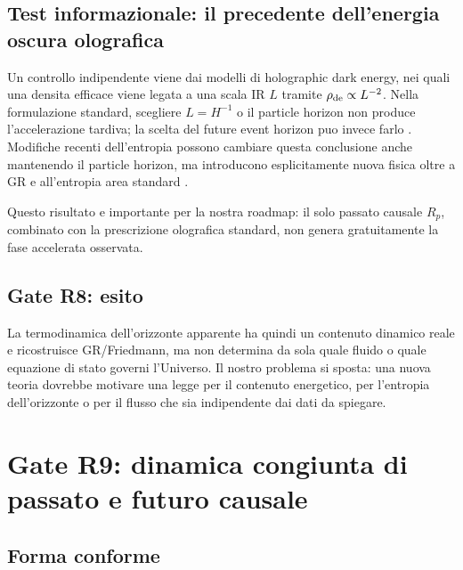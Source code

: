 \documentclass[11pt,a4paper]{article}
\begin{document}
\subsection{Test informazionale: il precedente dell'energia oscura olografica}

Un controllo indipendente viene dai modelli di holographic dark energy, nei quali una densita efficace viene legata a una scala IR $L$ tramite $\rho_{\rm de}\propto L^{-2}$. Nella formulazione standard, scegliere $L=H^{-1}$ o il particle horizon non produce l'accelerazione tardiva; la scelta del future event horizon puo invece farlo \cite{Akhlaghi2018}. Modifiche recenti dell'entropia possono cambiare questa conclusione anche mantenendo il particle horizon, ma introducono esplicitamente nuova fisica oltre a GR e all'entropia area standard \cite{Asvar2026}.

Questo risultato e importante per la nostra roadmap: il solo passato causale $R_p$, combinato con la prescrizione olografica standard, non genera gratuitamente la fase accelerata osservata.

\subsection{Gate R8: esito}

\begin{center}
\end{center}

La termodinamica dell'orizzonte apparente ha quindi un contenuto dinamico reale e ricostruisce GR/Friedmann, ma non determina da sola quale fluido o quale equazione di stato governi l'Universo. Il nostro problema si sposta: una nuova teoria dovrebbe motivare una legge per il contenuto energetico, per l'entropia dell'orizzonte o per il flusso che sia indipendente dai dati da spiegare.

\section{Gate R9: dinamica congiunta di passato e futuro causale}

\subsection{Forma conforme}
\end{document}
